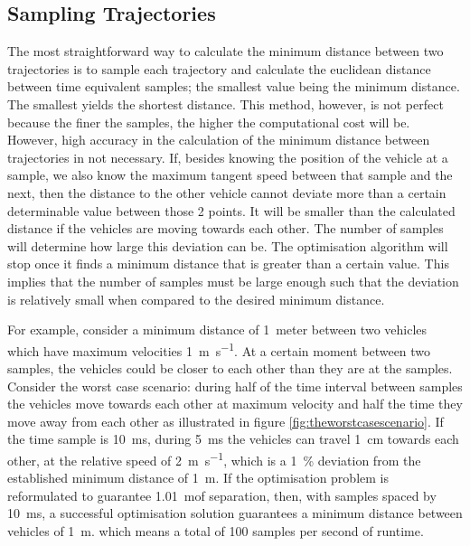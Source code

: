 \subsection{Sampling Trajectories}

\par The most straightforward way to calculate the minimum distance between two trajectories is to sample each trajectory and calculate the euclidean distance between time equivalent samples; the smallest value being the minimum distance. The smallest yields the shortest distance. This method, however, is not perfect because the finer the samples, the higher the computational cost will be. However, high accuracy in the calculation of the minimum distance between trajectories in not necessary. If, besides knowing the position of the vehicle at a sample, we also know the maximum tangent speed between that sample and the next, then the distance to the other vehicle cannot deviate more than a certain determinable value between those 2 points. It will be smaller than the calculated distance if the vehicles are moving towards each other. The number of samples will determine how large this deviation can be. The optimisation algorithm will stop once it finds a minimum distance that is greater than a certain value. This implies that the number of samples must be large enough such that the deviation is relatively small when compared to the desired minimum distance. 
\par For example, consider a minimum distance of \SI{1}{meter} between two vehicles which have maximum velocities \SI{1}{\meter\per\second}. At a certain moment between two samples, the vehicles could be closer to each other than they are at the samples. Consider the worst case scenario: during half of the time interval between samples the vehicles move towards each other at maximum velocity  and half the time they move away from each other as illustrated in figure \ref{fig:theworstcasescenario}. If the time sample is \SI{10}{\milli\second}, during \SI{5}{\milli\second} the vehicles can travel \SI{1}{\centi\meter} towards each other, at the relative speed of \SI{2}{\meter\per\second}, which is a \SI{1}{\percent} deviation from the established minimum distance of \SI{1}{\meter}. If the optimisation problem is reformulated to guarantee \SI{1.01}{\meter}of separation, then, with samples spaced by \SI{10}{\milli\second}, a successful optimisation solution guarantees a minimum distance between vehicles of \SI{1}{\meter}. which means a total of 100 samples per second of runtime.

